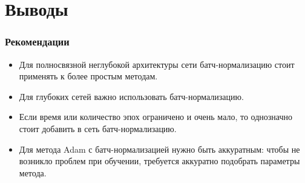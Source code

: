 \documentclass{beamer}
\begin{document}
\section{Выводы}



\begin{frame}
	\frametitle{Рекомендации}
\begin{itemize}
\item Для полносвязной неглубокой архитектуры сети батч-нормализацию стоит применять к более простым методам.
\item Для глубоких сетей важно использовать батч-нормализацию.
\item Если время или количество эпох ограничено и очень мало, то однозначно стоит добавить в сеть батч-нормализацию.
\item Для метода Adam с батч-нормализацией нужно быть аккуратным: чтобы не возникло проблем при обучении, требуется аккуратно подобрать параметры метода.
\end{itemize}
\end{frame}



\end{document}
